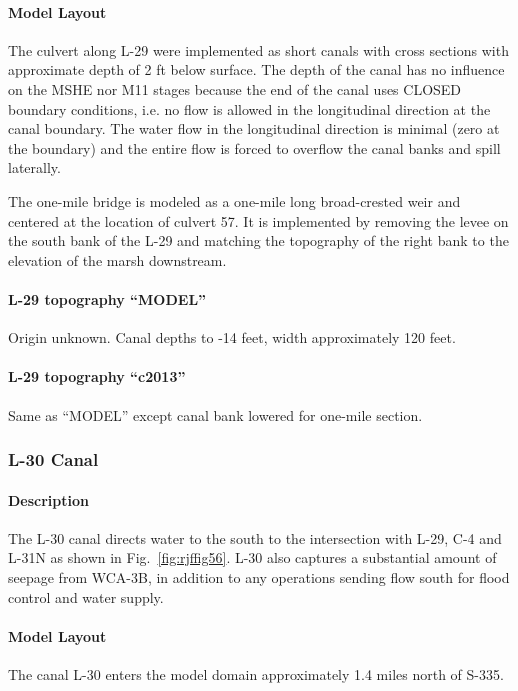 \paragraph{Model Layout}

The culvert along L-29 were implemented as short canals with cross sections with approximate depth of 2 ft below surface. The depth of the canal has no influence on the MSHE nor M11 stages because the end of the canal uses CLOSED boundary conditions, i.e. no flow is allowed in the longitudinal direction at the canal boundary. The water flow in the longitudinal direction is minimal (zero at the boundary) and the entire flow is forced to overflow the canal banks and spill laterally.

The one-mile bridge is modeled as a one-mile long broad-crested weir and centered at the location of culvert 57. It is implemented by removing the levee on the south bank of the L-29 and matching the topography of the right bank to the elevation of the marsh downstream.

\paragraph{L-29 topography ``MODEL''}
Origin unknown. Canal depths to -14 feet, width approximately 120 feet.

\paragraph{L-29 topography ``c2013''}
Same as ``MODEL'' except canal bank lowered for one-mile section.


\clearpage

\subsubsection{L-30 Canal}
\paragraph{Description}

The L-30 canal directs water to the south to the intersection with L-29, C-4 and L-31N as shown in Fig.~\ref{fig:rjffig56}. L-30 also captures a substantial amount of seepage from WCA-3B, in addition to any operations sending flow south for flood control and water supply.

\paragraph{Model Layout}
The canal L-30 enters the model domain approximately 1.4 miles north of S-335.

